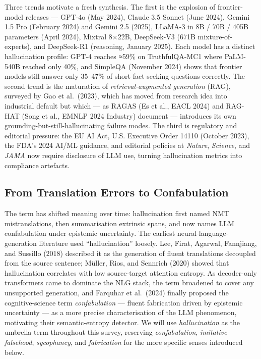 Three trends motivate a fresh synthesis. The first is the explosion of frontier-model releases --- GPT-4o (May 2024), Claude 3.5 Sonnet (June 2024), Gemini 1.5 Pro (February 2024) and Gemini 2.5 (2025), LLaMA-3 in 8B / 70B / 405B parameters (April 2024), Mixtral 8×22B, DeepSeek-V3 (671B mixture-of-experts), and DeepSeek-R1 (reasoning, January 2025). Each model has a distinct hallucination profile: GPT-4 reaches ≈59\% on TruthfulQA-MC1 where PaLM-540B reached only 40\%, and SimpleQA (November 2024) shows that frontier models still answer only 35--47\% of short fact-seeking questions correctly. The second trend is the maturation of \emph{retrieval-augmented generation} (RAG), surveyed by Gao et al.~(2023), which has moved from research idea into industrial default but which --- as RAGAS (Es et al., EACL 2024) and RAG-HAT (Song et al., EMNLP 2024 Industry) document --- introduces its own grounding-but-still-hallucinating failure modes. The third is regulatory and editorial pressure: the EU AI Act, U.S. Executive Order 14110 (October 2023), the FDA's 2024 AI/ML guidance, and editorial policies at \emph{Nature}, \emph{Science}, and \emph{JAMA} now require disclosure of LLM use, turning hallucination metrics into compliance artefacts.

\subsection{From Translation Errors to Confabulation}\label{from-translation-errors-to-confabulation}

The term has shifted meaning over time: hallucination first named NMT mistranslations, then summarisation extrinsic spans, and now names LLM confabulation under epistemic uncertainty. The earliest neural-language-generation literature used ``hallucination'' loosely. Lee, Firat, Agarwal, Fannjiang, and Sussillo (2018) described it as the generation of fluent translations decoupled from the source sentence; Müller, Rios, and Sennrich (2020) showed that hallucination correlates with low source-target attention entropy. As decoder-only transformers came to dominate the NLG stack, the term broadened to cover any unsupported generation, and Farquhar et al.~(2024) finally proposed the cognitive-science term \emph{confabulation} --- fluent fabrication driven by epistemic uncertainty --- as a more precise characterisation of the LLM phenomenon, motivating their semantic-entropy detector. We will use \emph{hallucination} as the umbrella term throughout this survey, reserving \emph{confabulation}, \emph{imitative falsehood}, \emph{sycophancy}, and \emph{fabrication} for the more specific senses introduced below.

